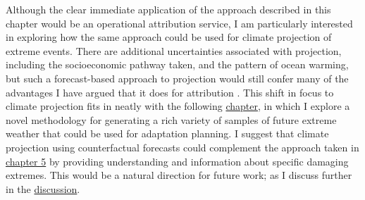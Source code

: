   Although the clear immediate application of the approach described in this chapter would be an operational attribution service, I am particularly interested in exploring how the same approach could be used for climate projection of extreme events. There are additional uncertainties associated with projection, including the socioeconomic pathway taken, and the pattern of ocean warming, but such a forecast-based approach to projection would still confer many of the advantages I have argued that it does for attribution \citep[e.g.][]{hazeleger_tales_2015}. This shift in focus to climate projection fits in neatly with the following \hyperref[ch5]{chapter}, in which I explore a novel methodology for generating a rich variety of samples of future extreme weather that could be used for adaptation planning. I suggest that climate projection using counterfactual forecasts could complement the approach taken in \hyperref[ch5]{chapter 5} by providing understanding and information about specific damaging extremes. This would be a natural direction for future work; as I discuss further in the \hyperref[discussion]{discussion}.